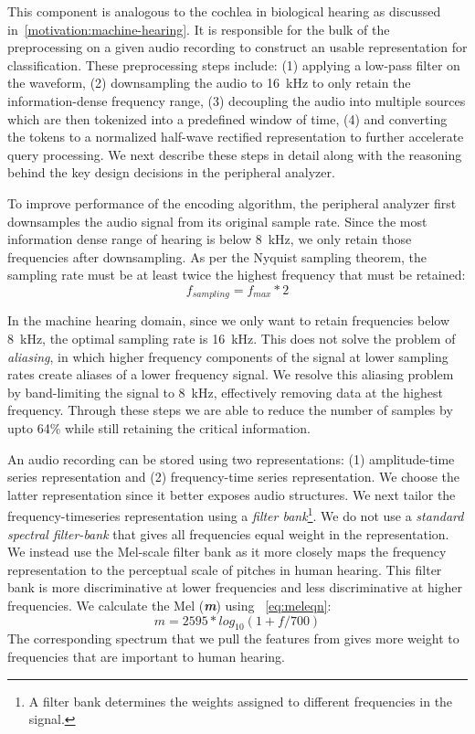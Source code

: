This component is analogous to the cochlea in biological hearing as discussed
in~\autoref{motivation:machine-hearing}.
%
It is responsible for the bulk of the preprocessing on a given audio recording
to construct an usable representation for classification.
%
These preprocessing steps include: 
(1) applying a low-pass filter on the waveform, 
%
(2) downsampling the audio to 16~kHz to only retain the information-dense
frequency range, 
%
(3) decoupling the audio into multiple sources which are then tokenized into a
predefined window of time, 
%
(4) and converting the tokens to a normalized half-wave rectified 
representation to further accelerate query processing.
%
We next describe these steps in detail along with the reasoning behind the 
key design decisions in the peripheral analyzer.

%
To improve performance of the encoding algorithm, the peripheral analyzer first 
downsamples the audio signal from its original sample rate.
%
Since the most information dense range of hearing is below 8~kHz,
we only retain those frequencies after downsampling.
%
As per the Nyquist sampling theorem, the sampling rate must be at
least twice the highest frequency that must be retained:
\begin{equation} \label{eq:nyq}
    f_{sampling} = f_{max} * 2
\end{equation}

In the machine hearing domain, since we only want to retain frequencies below
8~kHz, the optimal sampling rate is 16~kHz. 
%
This does not solve the problem of \textit{aliasing}, 
in which higher frequency components of the signal at lower sampling rates
create aliases of a lower frequency signal.
%
We resolve this aliasing problem by band-limiting the signal to 8~kHz,
effectively removing data at the highest frequency. 
%
Through these steps we are able to reduce the number of samples by upto
64\% while still retaining the critical information.

%
An audio recording can be stored using two representations: (1) amplitude-time
series representation and (2) frequency-time series representation.
%
We choose the latter representation since it better exposes audio structures.
%
We next tailor the frequency-timeseries representation using a \textit{filter
bank}\footnote{A filter bank determines the weights assigned to different
frequencies in the signal.}.
%
We do not use a \textit{standard spectral filter-bank} that gives all
frequencies equal weight in the representation.
%
We instead use the Mel-scale filter bank as it more closely maps the frequency
representation to the perceptual scale of pitches in human hearing.
%
This filter bank is more discriminative at lower frequencies and 
less discriminative at higher frequencies.
%
We calculate the Mel (\textbf{\textit{m}}) using ~\cref{eq:meleqn}:
\begin{equation} \label{eq:meleqn}
    \textit{m} = 2595 * log_{10}(1+\textit{f}/700)
\end{equation}
%
%
The corresponding spectrum that we pull the features from gives more weight to
frequencies that are important to human hearing.

